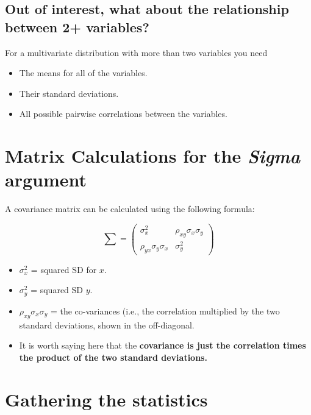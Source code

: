 \documentclass[
]{article}
\providecommand{\tightlist}{%
  \setlength{\itemsep}{0pt}\setlength{\parskip}{0pt}}
\begin{document}
\hypertarget{out-of-interest-what-about-the-relationship-between-2-variables}{%
\subsection{Out of interest, what about the relationship between 2+
variables?}\label{out-of-interest-what-about-the-relationship-between-2-variables}}

For a multivariate distribution with more than two variables you need

\begin{itemize}
\tightlist
\item
  The means for all of the variables.
\item
  Their standard deviations.
\item
  All possible pairwise correlations between the variables.
\end{itemize}

\hypertarget{matrix-calculations-for-the-sigma-argument}{%
\section{\texorpdfstring{Matrix Calculations for the \emph{Sigma}
argument}{Matrix Calculations for the Sigma argument}}\label{matrix-calculations-for-the-sigma-argument}}

A covariance matrix can be calculated using the following formula:

\[
\sum = \begin{pmatrix}\sigma_x^2 & \rho_{xy}\sigma_x\sigma_y \\ \rho_{yx}\sigma_y\sigma_x & \sigma_y^2 \end{pmatrix}
\]

\begin{itemize}
\tightlist
\item
  \(\sigma_x^2\) = squared SD for \(x\).
\item
  \(\sigma_y^2\) = squared SD \(y\).
\item
  \(\rho_{xy}\sigma_x\sigma_y\) = the co-variances (i.e., the
  correlation multiplied by the two standard deviations, shown in the
  off-diagonal.
\item
  It is worth saying here that the \textbf{covariance is just the
  correlation times the product of the two standard deviations.}
\end{itemize}

\hypertarget{gathering-the-statistics}{%
\section{Gathering the statistics}\label{gathering-the-statistics}}
\end{document}
